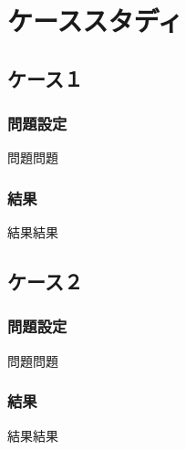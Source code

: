 \chapter{ケーススタディ}

\section{ケース１}

    \subsection{問題設定}
    問題問題
    
    \subsection{結果}
    結果結果
    

\section{ケース２}

    \subsection{問題設定}
    問題問題
    
    \subsection{結果}
    結果結果